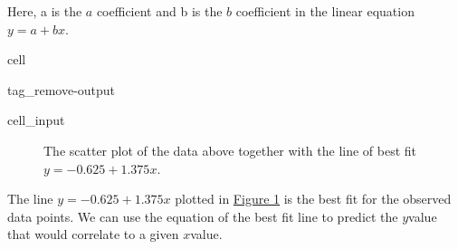 \documentclass[letterpaper,10pt,english]{jupyterBook}
\begin{document}
\begin{sphinxVerbatim}[commandchars=\\\{\}]
\end{sphinxVerbatim}

\sphinxAtStartPar
Here, a is the \(a\) coefficient and b is the \(b\) coefficient in the linear equation \(y = a + bx\).

\begin{sphinxuseclass}{cell}
\begin{sphinxuseclass}{tag_remove-output}\begin{sphinxVerbatimInput}

\begin{sphinxuseclass}{cell_input}
\begin{sphinxVerbatim}[commandchars=\\\{\}]

\end{sphinxVerbatim}

\end{sphinxuseclass}\end{sphinxVerbatimInput}

\end{sphinxuseclass}
\end{sphinxuseclass}
\begin{figure}[htbp]
\centering
\capstart

\noindent{}
\caption{The scatter plot of the data above together with the line of best fit \(y = -0.625 + 1.375x\).}\label{\detokenize{Ch8 Correlation and Linear Regression/8.3 The Regression Equation:regline1}}\end{figure}

\sphinxAtStartPar
The line \(y = -0.625 + 1.375x\) plotted in \hyperref[\detokenize{Ch8 Correlation and Linear Regression/8.3 The Regression Equation:regline1}]{Figure \ref{\detokenize{Ch8 Correlation and Linear Regression/8.3 The Regression Equation:regline1}}} is the best fit for the observed data points. We can use the equation of the best fit line to predict the \(y\)\sphinxhyphen{}value that would correlate to a given \(x\)\sphinxhyphen{}value.
\end{document}

